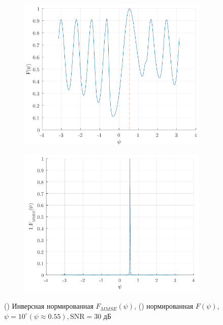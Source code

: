 \begin{figure}[h!]
    \begin{subfigure}{0.49\linewidth}
        \centering
        \includegraphics[width=\linewidth]{figs/fig4.10a}
        \caption{}
        \label{fig:4.10a}
    \end{subfigure}
    \begin{subfigure}{0.49\linewidth}
        \centering
        \includegraphics[width=\linewidth]{figs/fig4.10b}
        \caption{}
        \label{fig:4.10b}
    \end{subfigure}
    \caption{ () Инверсная нормированная $F_{MMSE}(\psi)$,
    () нормированная $F(\psi)$, $\psi=10^\circ(\psi \approx
    0.55), \text{SNR}=30$ дБ}
    \label{fig:4.100}
\end{figure}


